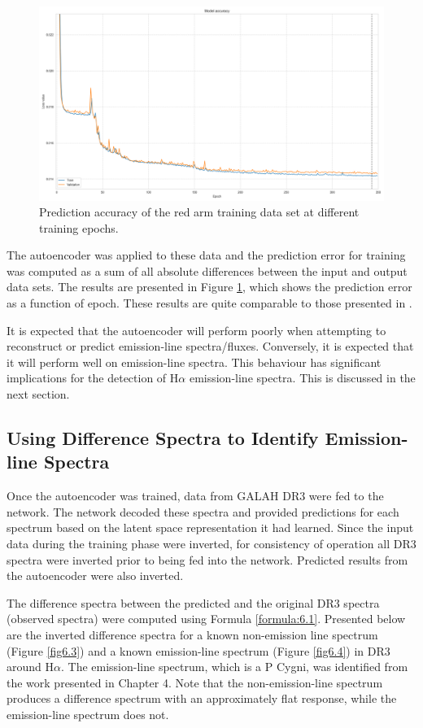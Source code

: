 \begin{figure}[!htb]
\centering
\includegraphics[scale=0.38]{figures/ann_network_loss.png}
\caption{Prediction accuracy of the red arm training data set at different training epochs.}
\label{fig6.2}
\end{figure}
The autoencoder was applied to these data and the prediction error for training was computed as a sum of all absolute differences between the input and output data sets. The results are presented in Figure \ref{fig6.2}, which shows the prediction error as a function of epoch. These results are quite comparable to those presented in \citet{vcotar2021galah}.

It is expected that the autoencoder will perform poorly when attempting to reconstruct or predict emission-line spectra/fluxes. Conversely, it is expected that it will perform well on emission-line spectra. This behaviour has significant implications for the detection of H$\alpha$ emission-line spectra. This is discussed in the next section.

\subsection{Using Difference Spectra to Identify Emission-line Spectra}

Once the autoencoder was trained, data from GALAH DR3 were fed to the network. The network decoded these spectra and provided predictions for each spectrum based on the latent space representation it had learned. Since the input data during the training phase were inverted, for consistency of operation all DR3 spectra were inverted prior to being fed into the network. Predicted results from the autoencoder were also inverted.

The difference spectra between the predicted and the original DR3 spectra (observed spectra) were computed using Formula \ref{formula:6.1}. Presented below are the inverted difference spectra for a known non-emission line spectrum (Figure \ref{fig6.3}) and a known emission-line spectrum (Figure \ref{fig6.4}) in DR3 around H$\alpha$. The emission-line spectrum, which is a P Cygni, was identified from the work presented in Chapter 4. Note that the non-emission-line spectrum produces a difference spectrum with an approximately flat response, while the emission-line spectrum does not. 


